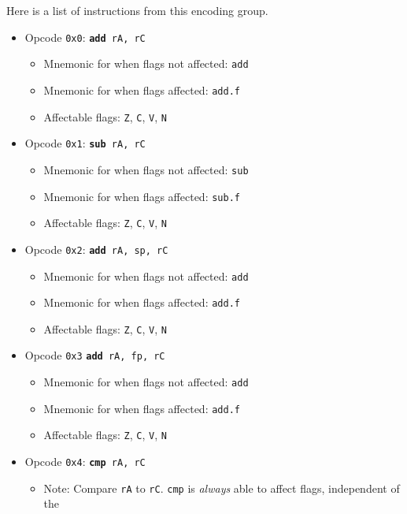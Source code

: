\documentclass{article}
\begin{document}
	Here is a list of instructions from this encoding group.

	\singlespacing
	\begin{itemize}
		\item Opcode \texttt{0x0}:
			\texttt{\textbf{add} rA, rC}
		\begin{itemize}
			\item Mnemonic for when flags not affected:  \texttt{add}
			\item Mnemonic for when flags affected:  \texttt{add.f}
			\item Affectable flags:
				\texttt{Z}, \texttt{C}, \texttt{V}, \texttt{N}
		\end{itemize}
		\item Opcode \texttt{0x1}:
			\texttt{\textbf{sub} rA, rC}
		\begin{itemize}
			\item Mnemonic for when flags not affected:  \texttt{sub}
			\item Mnemonic for when flags affected:  \texttt{sub.f}
			\item Affectable flags:
				\texttt{Z}, \texttt{C}, \texttt{V}, \texttt{N}
		\end{itemize}
		\item Opcode \texttt{0x2}:
			\texttt{\textbf{add} rA, sp, rC}
		\begin{itemize}
			\item Mnemonic for when flags not affected:  \texttt{add}
			\item Mnemonic for when flags affected:  \texttt{add.f}
			\item Affectable flags:
				\texttt{Z}, \texttt{C}, \texttt{V}, \texttt{N}
		\end{itemize}
		\item Opcode \texttt{0x3}
			\texttt{\textbf{add} rA, fp, rC}
		\begin{itemize}
			\item Mnemonic for when flags not affected:  \texttt{add}
			\item Mnemonic for when flags affected:  \texttt{add.f}
			\item Affectable flags:
				\texttt{Z}, \texttt{C}, \texttt{V}, \texttt{N}
		\end{itemize}
		\item Opcode \texttt{0x4}:
			\texttt{\textbf{cmp} rA, rC}
		\begin{itemize}
			\item Note:  Compare \texttt{rA} to \texttt{rC}.  \texttt{cmp}
			is \textit{always} able to affect flags, independent of the

\end{itemize}
\end{itemize}
\end{document}
